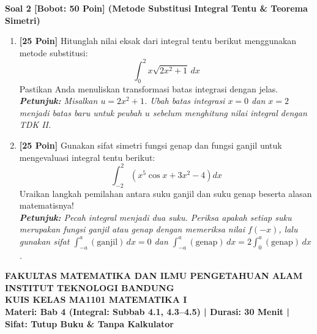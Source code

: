 \documentclass[11pt,a4paper]{article}
\begin{document}
\noindent\textbf{Soal 2 [Bobot: 50 Poin] (Metode Substitusi Integral Tentu \& Teorema Simetri)}
\begin{enumerate}[label=(\alph*), leftmargin=22pt]
    \item \textbf{[25 Poin]} Hitunglah nilai eksak dari integral tentu berikut menggunakan metode substitusi:
    \[
    \int_{0}^{2} x\sqrt{2x^2 + 1}\,dx
    \]
    Pastikan Anda menuliskan transformasi batas integrasi dengan jelas.\\
    \textit{\small\textbf{Petunjuk:} Misalkan $u = 2x^2 + 1$. Ubah batas integrasi $x = 0$ dan $x = 2$ menjadi batas baru untuk peubah $u$ sebelum menghitung nilai integral dengan TDK II.}
    
    \vspace{8pt}
    \item \textbf{[25 Poin]} Gunakan sifat simetri fungsi genap dan fungsi ganjil untuk mengevaluasi integral tentu berikut:
    \[
    \int_{-2}^{2} \left( {x^5 \cos x} + 3x^2 - 4 \right) dx
    \]
    Uraikan langkah pemilahan antara suku ganjil dan suku genap beserta alasan matematisnya!\\
    \textit{\small\textbf{Petunjuk:} Pecah integral menjadi dua suku. Periksa apakah setiap suku merupakan fungsi ganjil atau genap dengan memeriksa nilai $f(-x)$, lalu gunakan sifat $\int_{-a}^a (\text{ganjil})\,dx = 0$ dan $\int_{-a}^a (\text{genap})\,dx = 2\int_0^a (\text{genap})\,dx$.}
\end{enumerate}

\newpage

\begin{center}
    {\large \textbf{FAKULTAS MATEMATIKA DAN ILMU PENGETAHUAN ALAM}}\\
    {\large \textbf{INSTITUT TEKNOLOGI BANDUNG}}\\[3pt]
    {\large \textbf{KUIS KELAS MA1101 MATEMATIKA I}}\\[2pt]
    \textbf{Materi: Bab 4 (Integral: Subbab 4.1, 4.3--4.5) \quad | \quad Durasi: 30 Menit \quad | \quad Sifat: Tutup Buku \& Tanpa Kalkulator}
\end{center}

\vspace{1pt}
\noindent{}
\end{document}
